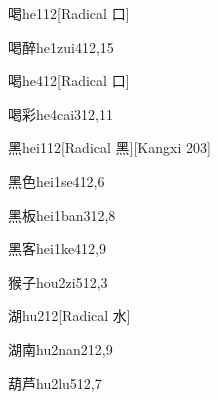 \begin{verbete}{喝}{he1}{12}[Radical 口]
\end{verbete}

\begin{verbete}{喝醉}{he1zui4}{12,15}
\end{verbete}

\begin{verbete}{喝}{he4}{12}[Radical 口]
\end{verbete}

\begin{verbete}{喝彩}{he4cai3}{12,11}
\end{verbete}

\begin{verbete}{黑}{hei1}{12}[Radical ⿊][Kangxi 203]
\end{verbete}

\begin{verbete}{黑色}{hei1se4}{12,6}
\end{verbete}

\begin{verbete}{黑板}{hei1ban3}{12,8}
\end{verbete}

\begin{verbete}{黑客}{hei1ke4}{12,9}
\end{verbete}

\begin{verbete}{猴子}{hou2zi5}{12,3}
\end{verbete}

\begin{verbete}{湖}{hu2}{12}[Radical 水]
\end{verbete}

\begin{verbete}{湖南}{hu2nan2}{12,9}
\end{verbete}

\begin{verbete}{葫芦}{hu2lu5}{12,7}
\end{verbete}

